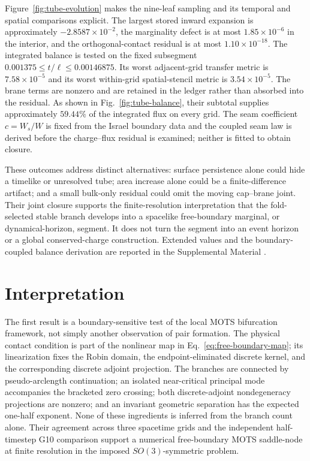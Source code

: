\documentclass[11pt]{article}
\begin{document}
Figure~\ref{fig:tube-evolution} makes the nine-leaf sampling and its temporal
and spatial comparisons explicit.  The largest stored inward expansion is approximately
$-2.8587\times10^{-2}$, the marginality defect is at most
$1.85\times10^{-6}$ in the interior, and the orthogonal-contact residual is
at most $1.10\times10^{-18}$.  The integrated balance is tested on the fixed
subsegment $0.001375\leq t/\ell\leq0.00146875$.  Its worst adjacent-grid
transfer metric is $7.58\times10^{-5}$ and its worst within-grid spatial-stencil
metric is $3.54\times10^{-5}$.  The brane terms are nonzero and are retained
in the ledger rather than absorbed into the residual.  As shown in
Fig.~\ref{fig:tube-balance}, their subtotal supplies approximately $59.44\%$
of the integrated flux on every grid.  The seam coefficient $c=W_s/W$ is fixed
from the Israel boundary data and the coupled seam law is derived before the
charge--flux residual is examined; neither is fitted to obtain closure.

These outcomes address distinct alternatives: surface persistence alone could
hide a timelike or unresolved tube; area increase alone could be a
finite-difference artifact; and a small bulk-only residual could omit the
moving cap--brane joint.  Their joint closure supports the finite-resolution
interpretation that the fold-selected stable branch develops into a spacelike
free-boundary marginal, or dynamical-horizon, segment.  It does not turn the
segment into an event horizon or a global conserved-charge construction.
Extended values and the boundary-coupled balance derivation are reported in
the Supplemental Material \cite{SupplementalMaterial}.

\section{Interpretation}

The first result is a boundary-sensitive test of the local MOTS bifurcation
framework, not simply another observation of pair formation.  The physical
contact condition is part of the nonlinear map in
Eq.~\eqref{eq:free-boundary-map}; its linearization fixes the Robin domain,
the endpoint-eliminated discrete kernel, and the corresponding discrete
adjoint projection.  The branches are connected by pseudo-arclength
continuation; an isolated near-critical principal mode accompanies the
bracketed zero crossing; both discrete-adjoint nondegeneracy projections are
nonzero; and an invariant geometric separation has the expected one-half exponent.
None of these ingredients is inferred from the branch count alone.  Their
agreement across three spacetime grids and the independent half-timestep G10
comparison support a numerical free-boundary MOTS saddle-node at finite
resolution in the imposed $SO(3)$-symmetric problem.
\end{document}
